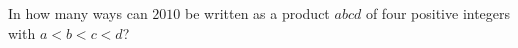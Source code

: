 In how many ways can $2010$ be written as a product $abcd$ of four positive integers with $a<b<c<d$?
